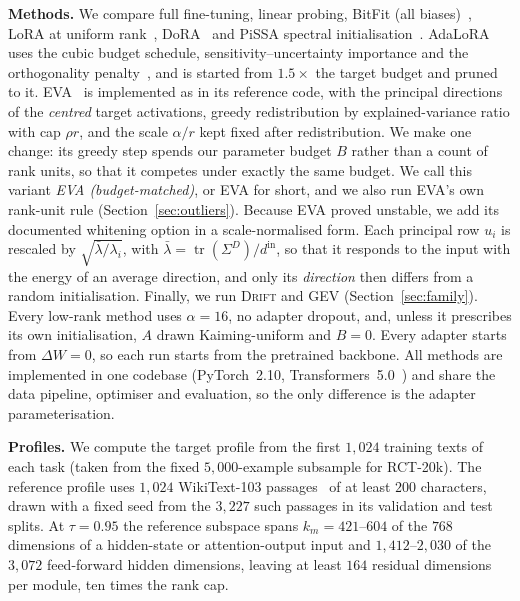 \documentclass[conference,onecolumn]{IEEEtran}
\newcommand{\method}{\textsc{Drift}}
\newcommand{\tr}{\operatorname{tr}}
\begin{document}
\noindent\textbf{Methods.} We compare full fine-tuning, linear probing, BitFit
(all biases)~\cite{benzaken2022bitfit}, LoRA at uniform
rank~\cite{hu2022lora}, DoRA~\cite{liu2024dora} and PiSSA spectral
initialisation~\cite{meng2024pissa}. AdaLoRA uses the cubic budget schedule,
sensitivity--uncertainty importance and the orthogonality
penalty~\cite{zhang2023adalora}, and is started from $1.5\times$ the target
budget and pruned to it. EVA~\cite{paischer2025eva} is implemented as in its
reference code, with the principal directions of the \emph{centred} target
activations, greedy redistribution by explained-variance ratio with cap
$\rho r$, and the scale $\alpha/r$ kept fixed after redistribution. We make one
change: its greedy step spends our parameter budget $B$ rather than a count of
rank units, so that it competes under exactly the same budget. We call this
variant \emph{EVA (budget-matched)}, or EVA for short, and we also run EVA's own
rank-unit rule (Section~\ref{sec:outliers}). Because EVA proved unstable, we add
its documented whitening option in a scale-normalised form. Each principal row
$u_i$ is rescaled by $\sqrt{\bar\lambda/\lambda_i}$, with
$\bar\lambda = \tr(\Sigma^{D})/d^{\mathrm{in}}$, so that it responds to the input
with the energy of an average direction, and only its \emph{direction} then
differs from a random initialisation. Finally, we run \method{} and GEV
(Section~\ref{sec:family}). Every low-rank method uses $\alpha = 16$, no adapter
dropout, and, unless it prescribes its own initialisation, $A$ drawn
Kaiming-uniform and $B = 0$. Every adapter starts from $\Delta W = 0$, so each
run starts from the pretrained backbone.
All methods are implemented in one codebase (PyTorch~2.10,
Transformers~5.0~\cite{wolf2020transformers}) and share the data pipeline,
optimiser and evaluation, so the only difference is the adapter
parameterisation.

\noindent\textbf{Profiles.}
We compute the target profile from the first $1{,}024$ training texts of each
task (taken from the fixed $5{,}000$-example subsample for RCT-20k). The
reference profile uses $1{,}024$ WikiText-103
passages~\cite{merity2017wikitext} of at least $200$ characters, drawn with a
fixed seed from the $3{,}227$ such passages in its validation and test splits.
At $\tau = 0.95$ the reference subspace spans
$k_m = 421$--$604$ of the $768$ dimensions of a hidden-state or attention-output
input and $1{,}412$--$2{,}030$ of the $3{,}072$ feed-forward hidden dimensions,
leaving at least $164$ residual dimensions per module, ten times the rank cap.
\end{document}
